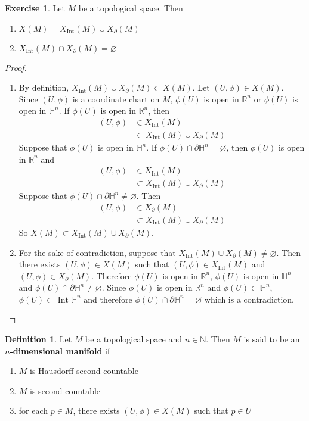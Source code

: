 \documentclass[12pt]{amsart}
\theoremstyle{definition}
\newtheorem{defn}[definition]{Definition}
\newtheorem{ex}[definition]{Exercise}
\newcommand{\N}{\mathbb{N}}
\renewcommand{\H}{\mathbb{H}}
\newcommand{\R}{\mathbb{R}}
\newcommand{\p}{\partial}
\DeclareMathOperator{\Int}{Int}
\begin{document}
	\begin{ex}
		Let $M$ be a topological space. Then 
		\begin{enumerate}
			\item $X(M) = X_{\Int}(M) \cup X_{\p}(M)$
			\item $X_{\Int}(M) \cap X_{\p}(M) = \varnothing$
		\end{enumerate}
	\end{ex}

	\begin{proof}\
		\begin{enumerate}
			\item By definition, $X_{\Int}(M) \cup X_{\p}(M) \subset X(M)$. Let $(U, \phi) \in X(M)$. Since $(U, \phi)$ is a coordinate chart on $M$, $\phi(U)$ is open in $\R^n$ or $\phi(U)$ is open in $\H^n$. If $\phi(U)$ is open in $\R^n$, then 
			\begin{align*}
				(U, \phi) 
				& \in X_{\Int}(M) \\
				& \subset X_{\Int}(M) \cup X_{\p}(M)
			\end{align*}
			Suppose that $\phi(U)$ is open in $\H^n$. If $\phi(U) \cap \p \H^n = \varnothing$, then $\phi(U)$ is open in $\R^n$ and 
			\begin{align*}
				(U, \phi) 
				& \in X_{\Int}(M) \\
				& \subset X_{\Int}(M) \cup X_{\p}(M)
			\end{align*}
			Suppose that $\phi(U) \cap \p \H^n \neq \varnothing$. Then 
			\begin{align*}
				(U, \phi) 
				& \in X_{\p}(M) \\
				& \subset X_{\Int}(M) \cup X_{\p}(M)
			\end{align*}
			So $X(M) \subset X_{\Int}(M) \cup X_{\p}(M)$.
			\item For the sake of contradiction, suppose that $X_{\Int}(M) \cup X_{\p}(M) \neq \varnothing$. Then there exists $(U, \phi) \in X(M)$ such that $(U, \phi) \in X_{\Int}(M)$ and $(U, \phi) \in X_{\p}(M)$. Therefore $\phi(U)$ is open in $\R^n$, $\phi(U)$ is open in $\H^n$ and $\phi(U) \cap \p \H^n \neq \varnothing$. Since $\phi(U)$ is open in $\R^n$ and $\phi(U) \subset \H^n$, $\phi(U) \subset \Int \H^n$ and therefore $\phi(U) \cap \p \H^n = \varnothing$ which is a contradiction.
		\end{enumerate}
	\end{proof}

	\begin{defn}
		Let $M$ be a topological space and $n \in \N$. Then $M$ is said to be an \textbf{$n$-dimensional manifold} if  
		\begin{enumerate}
			\item $M$ is Hausdorff  second countable
			\item $M$ is second countable
			\item for each $p \in M$, there exists $(U, \phi) \in X(M)$ such that $p \in U$
		\end{enumerate}
	\end{defn}
\end{document}
